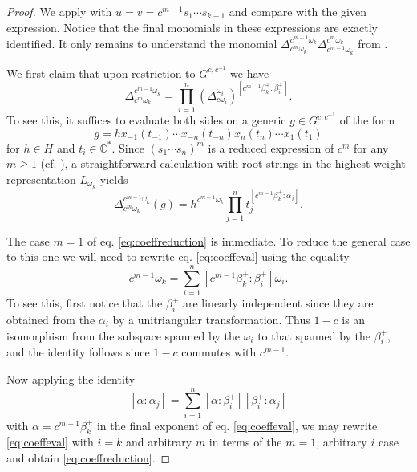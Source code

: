 \documentclass[11pt]{amsart}
\newcommand{\bC}{\mathbb{C}}
\numberwithin{equation}{section}
\begin{document}
  \begin{proof}
    We apply  with $u = v = c^{m-1}s_1 \cdots s_{k-1}$ and compare with the given expression.  Notice that the final monomials in these expressions are exactly identified.  It only remains to understand the monomial $\Delta_{c^m \omega_k}^{c^{m-1} \omega_k}\Delta_{c^{m-1} \omega_k}^{c^m \omega_k}$ from .

    We first claim that upon restriction to $G^{c,c^{-1}}$ we have
    \begin{equation}\label{eq:coeffreduction}
      \Delta_{c^m \omega_k}^{c^{m-1} \omega_k} = 
      \prod_{i=1}^n (\Delta_{c \omega_i}^{\omega_i})^{[c^{m-1}\beta_k^+:\beta_i^+]}.
    \end{equation}
    To see this, it suffices to evaluate both sides on a generic $g \in G^{c,c^{-1}}$ of the form
    \[
      g = hx_{-1}(t_{-1}) \cdots x_{-n}(t_{-n}) x_{n}(t_{n}) \cdots x_{1}(t_{1})
    \]
    for $h \in H$ and $t_i \in \bC^*$.  Since $(s_1 \cdots s_n)^m$ is a reduced expression of $c^m$ for any $m \geq 1$ (cf. \cite{Spe09}), a straightforward calculation with root strings in the highest weight representation $L_{\omega_k}$ yields
    \begin{equation}\label{eq:coeffeval}
      \Delta_{c^m \omega_k}^{c^{m-1}\omega_k}(g) = h^{c^{m-1}\omega_k} \prod_{j=1}^n t_j^{[c^{m-1}\beta_k^+:\alpha_j]}.
    \end{equation}
    
    The case $m=1$ of eq. \eqref{eq:coeffreduction} is immediate.  To reduce the general case to this one we will need to rewrite eq. \eqref{eq:coeffeval} using the equality
    \[
      c^{m-1} \omega_k = \sum_{i=1}^n [c^{m-1}\beta_k^+:\beta_i^+]\omega_i.
    \]
    To see this, first notice that the $\beta_i^+$ are linearly independent since they are obtained from the $\alpha_i$ by a unitriangular transformation.  Thus $1-c$ is an isomorphism from the subspace spanned by the $\omega_i$ to that spanned by the $\beta_i^+$, and the identity follows since $1-c$ commutes with $c^{m-1}$.  

    Now applying the identity
    \[
      [\alpha:\alpha_j] = \sum_{i=1}^n [\alpha:\beta_i^+][\beta_i^+:\alpha_j]
    \]
    with $\alpha=c^{m-1}\beta_k^+$ in the final exponent of eq. \eqref{eq:coeffeval},
    we may rewrite \cref{eq:coeffeval} with $i = k$ and arbitrary $m$ in terms of the $m = 1$, arbitrary $i$ case and obtain \cref{eq:coeffreduction}.


\end{proof}
\end{document}
